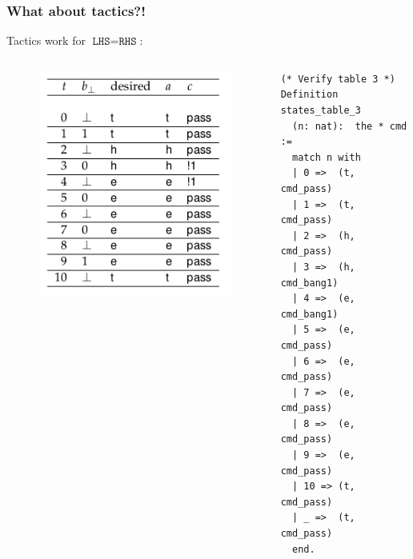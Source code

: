 \documentclass{beamer}
\begin{document}
\begin{frame}[fragile]
\frametitle{What about tactics?!}
\pause

Tactics work for $\texttt{LHS} = \texttt{RHS}$:
\pause

\begin{columns}[T] %
\begin{column}{.25\textwidth}
\begin{figure}
\centering
\includegraphics[width=\textwidth]{table-3.png}
\end{figure}
\end{column}
\begin{column}{.3\textwidth}
{\fontsize{2.5}{4}\selectfont
\begin{verbatim}
(* Verify table 3 *)
Definition states_table_3
  (n: nat):  the * cmd :=
  match n with
  | 0 =>  (t, cmd_pass)
  | 1 =>  (t, cmd_pass)
  | 2 =>  (h, cmd_pass)
  | 3 =>  (h, cmd_bang1)
  | 4 =>  (e, cmd_bang1) 
  | 5 =>  (e, cmd_pass) 
  | 6 =>  (e, cmd_pass) 
  | 7 =>  (e, cmd_pass) 
  | 8 =>  (e, cmd_pass) 
  | 9 =>  (e, cmd_pass) 
  | 10 => (t, cmd_pass) 
  | _ =>  (t, cmd_pass)
  end.
 \end{verbatim}
}
\end{column}
\end{columns}
\end{frame}
\end{document}
